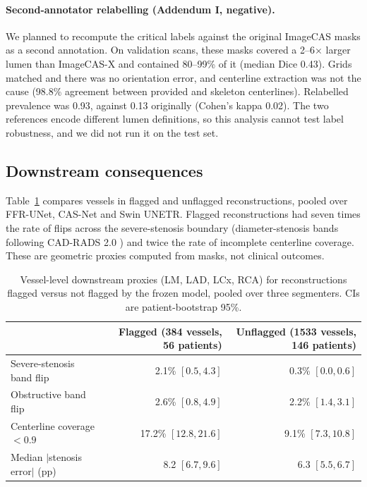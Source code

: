\documentclass[11pt]{article}
\begin{document}
\paragraph{Second-annotator relabelling (Addendum I, negative).} We planned to recompute the critical labels against the original ImageCAS masks as a second annotation. On validation scans, these masks covered a 2--6$\times$ larger lumen than ImageCAS-X and contained 80--99\% of it (median Dice 0.43). Grids matched and there was no orientation error, and centerline extraction was not the cause (98.8\% agreement between provided and skeleton centerlines). Relabelled prevalence was 0.93, against 0.13 originally (Cohen's kappa 0.02). The two references encode different lumen definitions, so this analysis cannot test label robustness, and we did not run it on the test set.

\subsection{Downstream consequences}
Table~\ref{tab:clin} compares vessels in flagged and unflagged reconstructions, pooled over FFR-UNet, CAS-Net and Swin UNETR. Flagged reconstructions had seven times the rate of flips across the severe-stenosis boundary (diameter-stenosis bands following CAD-RADS 2.0 \citep{cury2022cadrads}) and twice the rate of incomplete centerline coverage. These are geometric proxies computed from masks, not clinical outcomes.

\begin{table}[t]
\centering
\small
\caption{Vessel-level downstream proxies (LM, LAD, LCx, RCA) for reconstructions flagged versus not flagged by the frozen model, pooled over three segmenters. CIs are patient-bootstrap 95\%.}
\label{tab:clin}
\begin{tabular}{lrr}
\toprule
 & Flagged (384 vessels, 56 patients) & Unflagged (1533 vessels, 146 patients) \\
\midrule
Severe-stenosis band flip & 2.1\% $[0.5, 4.3]$ & 0.3\% $[0.0, 0.6]$ \\
Obstructive band flip & 2.6\% $[0.8, 4.9]$ & 2.2\% $[1.4, 3.1]$ \\
Centerline coverage $< 0.9$ & 17.2\% $[12.8, 21.6]$ & 9.1\% $[7.3, 10.8]$ \\
Median $|$stenosis error$|$ (pp) & 8.2 $[6.7, 9.6]$ & 6.3 $[5.5, 6.7]$ \\
\bottomrule
\end{tabular}
\end{table}
\end{document}
